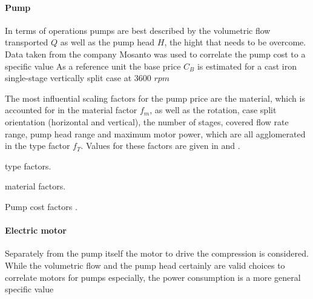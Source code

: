 		\paragraph{Pump}
			In terms of operations pumps are best described by the volumetric flow transported $Q$ as
			well as the pump head $H$, the hight that needs to be overcome. Data taken from the company
			Mosanto was used to correlate the pump cost to a specific value
			As a reference unit the base price $C_B$ is estimated for a cast iron single-stage
			vertically split case at 3600 $rpm$
			
			The most influential scaling factors for the pump price are the material, which is accounted
			for in the material factor $f_m$, as well as the rotation, case split orientation (horizontal
			and vertical), the number of stages, covered flow rate range, pump head range and maximum
			motor power, which are all agglomerated in the type factor $f_T$. Values for these factors
			are given in  and .
			
            \begin{table}
                \center
                \begin{subtable}{.68\linewidth}
                    \footnotesize
                    \center
                    
                    \caption{type factors.}
                    \label{tab:pump:Type}
                \end{subtable}
                \begin{subtable}{.3\linewidth}
                    \footnotesize
                    \center
                    
                    \caption{material factors.}
                    \label{tab:pump:Material}
                \end{subtable}
                \caption{Pump cost factors \cite{Seider.2010}.}
            \end{table}
			
		\paragraph{Electric motor}
			Separately from the pump itself the motor to drive the compression is considered. While the
			volumetric flow and the pump head certainly are valid choices to correlate motors for pumps
			especially, the power consumption is a more general specific value
			
